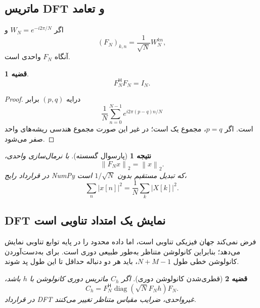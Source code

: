 \documentclass[12pt,openany,oneside]{book}
\newtheorem{theorem}{قضیه}[chapter]
\newtheorem{corollary}{نتیجه}[chapter]
\newcommand{\norm}[1]{\left\lVert #1\right\rVert}
\newcommand{\herm}{^{\mathsf H}}
\newcommand{\diag}{\operatorname{diag}}
\begin{document}
\subsection{ماتریس DFT و تعامد}
اگر \(W_N=e^{-i2\pi/N}\) و
\begin{equation}
(F_N)_{k,n}=\frac{1}{\sqrt N}W_N^{kn},
\end{equation}
آنگاه \(F_N\) واحدی است.

\begin{theorem}
\begin{equation}
F_N\herm F_N=I_N.
\end{equation}
\end{theorem}

\begin{proof}
درایه \((p,q)\) برابر
\begin{equation}
\frac{1}{N}\sum_{n=0}^{N-1}e^{i2\pi(p-q)n/N}
\end{equation}
است. اگر \(p=q\)، مجموع یک است؛ در غیر این صورت مجموع هندسی ریشه‌های واحد صفر می‌شود.
\end{proof}

\begin{corollary}[پارسوال گسسته]
با نرمال‌سازی واحدی،
\begin{equation}
\norm{F_Nx}_2=\norm{x}_2.
\end{equation}
در قرارداد رایج NumPy که تبدیل مستقیم بدون \(1/\sqrt N\) است،
\begin{equation}
\sum_n|x[n]|^2=\frac{1}{N}\sum_k|X[k]|^2.
\end{equation}
\end{corollary}

\subsection{DFT نمایش یک امتداد تناوبی است}
 فرض نمی‌کند جهان فیزیکی تناوبی است، اما داده محدود را در پایه توابع تناوبی نمایش می‌دهد؛
بنابراین کانولوشن متناظر به‌طور طبیعی دوری است. برای به‌دست‌آوردن کانولوشن خطی طول \(N+M-1\)، باید
هر دو دنباله حداقل تا این طول پد شوند.

\begin{theorem}[قطری‌شدن کانولوشن دوری]
اگر \(C_h\) ماتریس دوری کانولوشن با \(h\) باشد،
\begin{equation}
C_h=F_N\herm\diag(\sqrt N F_Nh)F_N.
\label{eq:circulant-diag}
\end{equation}
در قرارداد DFT غیرواحدی، ضرایب مقیاس متناظر تغییر می‌کنند.
\end{theorem}
\end{document}
